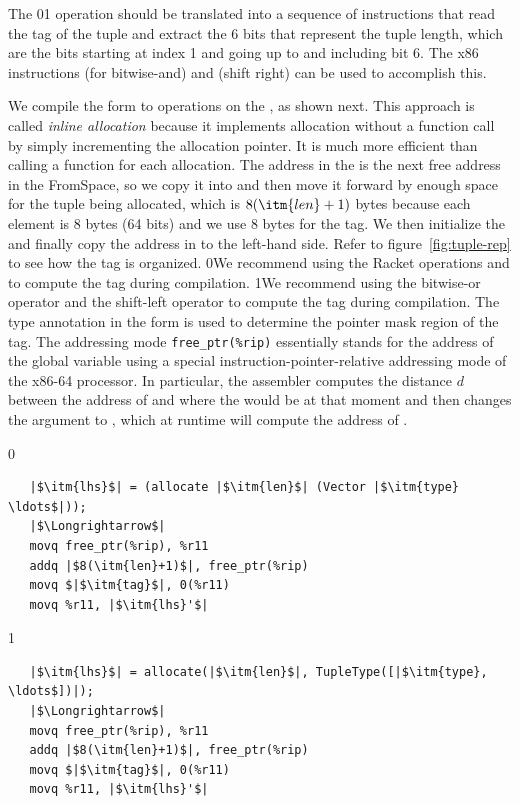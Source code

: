 \documentclass[7x10]{TimesAPriori_MIT}%
\def\racketEd{0}
\def\pythonEd{1}
\def\edition{0}
\newcommand{\racket}[1]{{\if\edition\racketEd{#1}\fi}}
\newcommand{\python}[1]{{\if\edition\pythonEd #1\fi}}
\numberwithin{theorem}{chapter}
\numberwithin{definition}{chapter}
\numberwithin{equation}{chapter}
\begin{document}
The \racket{}\python{} operation should
be translated into a sequence of instructions that read the tag of the
tuple and extract the 6 bits that represent the tuple length, which
are the bits starting at index 1 and going up to and including bit 6.
The x86 instructions  (for bitwise-and) and 
(shift right) can be used to accomplish this.

We compile the  form to operations on the
, as shown next.  This approach is called
\emph{inline allocation} because it implements allocation without a
function call by simply incrementing the allocation pointer. It is much
more efficient than calling a function for each allocation. The
address in the  is the next free address in the
FromSpace, so we copy it into  and then move it forward by
enough space for the tuple being allocated, which is $8(\itm{len}+1)$
bytes because each element is 8 bytes (64 bits) and we use 8 bytes for
the tag.  We then initialize the  and finally copy the
address in  to the left-hand side. Refer to
figure~\ref{fig:tuple-rep} to see how the tag is organized.
%
\racket{We recommend using the Racket operations
\code{bitwise-ior} and \code{arithmetic-shift} to compute the tag
during compilation.}
%
\python{We recommend using the bitwise-or operator \code{|} and the
  shift-left operator \code{<<} to compute the tag during
  compilation.}
%
The type annotation in the  form is used to determine
the pointer mask region of the tag.
%
The addressing mode \verb!free_ptr(%rip)! essentially stands for the
address of the  global variable using a special
instruction-pointer-relative addressing mode of the x86-64 processor.
In particular, the assembler computes the distance $d$ between the
address of  and where the  would be at that
moment and then changes the  argument to
, which at runtime will compute the address of
.
%
{\if\edition\racketEd
\begin{lstlisting}
   |$\itm{lhs}$| = (allocate |$\itm{len}$| (Vector |$\itm{type} \ldots$|));
   |$\Longrightarrow$|
   movq free_ptr(%rip), %r11
   addq |$8(\itm{len}+1)$|, free_ptr(%rip)
   movq $|$\itm{tag}$|, 0(%r11)
   movq %r11, |$\itm{lhs}'$|
\end{lstlisting}
\fi}
{\if\edition\pythonEd    
\begin{lstlisting}
   |$\itm{lhs}$| = allocate(|$\itm{len}$|, TupleType([|$\itm{type}, \ldots$])|);
   |$\Longrightarrow$|
   movq free_ptr(%rip), %r11
   addq |$8(\itm{len}+1)$|, free_ptr(%rip)
   movq $|$\itm{tag}$|, 0(%r11)
   movq %r11, |$\itm{lhs}'$|
\end{lstlisting}
\fi}
\end{document}
